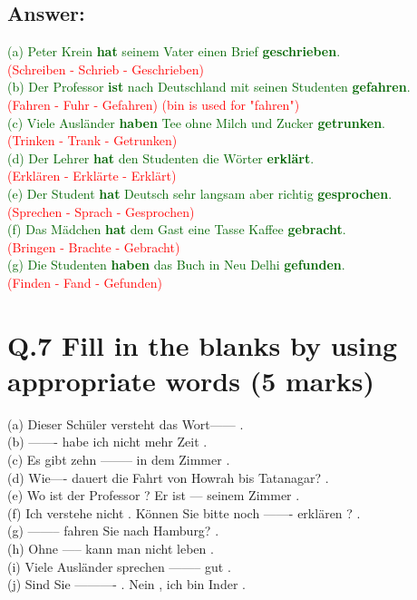 \documentclass[a4paper,12pt]{article}
\begin{document}
\subsection*{Answer:}
\textcolor{darkgreen}{(a) Peter Krein \textbf{hat} seinem Vater einen Brief \textbf{geschrieben}.}\\ \textcolor{red}{(Schreiben - Schrieb - Geschrieben)}\\
\textcolor{darkgreen}{(b) Der Professor \textbf{ist} nach Deutschland mit seinen Studenten \textbf{gefahren}.}\\ \textcolor{red}{(Fahren - Fuhr - Gefahren) (bin is used for "fahren")}\\
\textcolor{darkgreen}{(c) Viele Ausländer \textbf{haben} Tee ohne Milch und Zucker \textbf{getrunken}.}\\ \textcolor{red}{(Trinken - Trank - Getrunken)}\\
\textcolor{darkgreen}{(d) Der Lehrer \textbf{hat} den Studenten die Wörter \textbf{erklärt}.}\\ \textcolor{red}{(Erklären - Erklärte - Erklärt)}\\
\textcolor{darkgreen}{(e) Der Student \textbf{hat} Deutsch sehr langsam aber richtig \textbf{gesprochen}.}\\ \textcolor{red}{(Sprechen - Sprach - Gesprochen)}\\
\textcolor{darkgreen}{(f) Das Mädchen \textbf{hat} dem Gast eine Tasse Kaffee \textbf{gebracht}.}\\ \textcolor{red}{(Bringen - Brachte - Gebracht)}\\
\textcolor{darkgreen}{(g) Die Studenten \textbf{haben} das Buch in Neu Delhi \textbf{gefunden}.}\\ \textcolor{red}{(Finden - Fand - Gefunden)}\\

\vspace{0.5cm}

\section*{Q.7 Fill in the blanks by using appropriate words (5 marks)}

(a) Dieser Schüler versteht das Wort------ .\\
(b) ------- habe ich nicht mehr Zeit .\\
(c) Es gibt zehn -------- in dem Zimmer .\\
(d) Wie---- dauert die Fahrt von Howrah bis Tatanagar? .\\
(e) Wo ist der Professor ? Er ist --- seinem Zimmer .\\
(f) Ich verstehe nicht . Können Sie bitte noch ------- erklären ? .\\
(g) -------- fahren Sie nach Hamburg? .\\
(h) Ohne ----- kann man nicht leben .\\
(i) Viele Ausländer sprechen -------- gut .\\ 
(j) Sind Sie ---------- . Nein , ich bin Inder .
\end{document}
